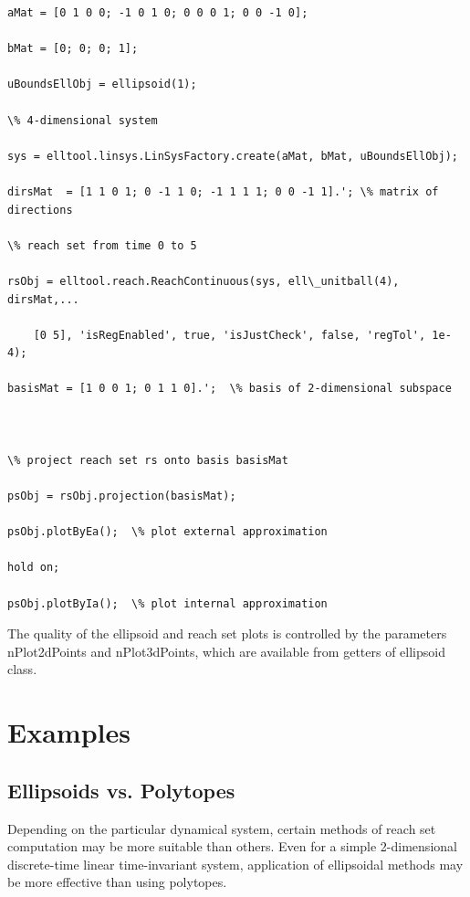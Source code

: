 \documentclass[letterpaper,10pt,english]{sphinxmanual}
\begin{document}
\begin{Verbatim}[commandchars=\\\{\}]
aMat = [0 1 0 0; -1 0 1 0; 0 0 0 1; 0 0 -1 0];

bMat = [0; 0; 0; 1];

uBoundsEllObj = ellipsoid(1);

\% 4-dimensional system

sys = elltool.linsys.LinSysFactory.create(aMat, bMat, uBoundsEllObj);

dirsMat  = [1 1 0 1; 0 -1 1 0; -1 1 1 1; 0 0 -1 1].'; \% matrix of directions

\% reach set from time 0 to 5

rsObj = elltool.reach.ReachContinuous(sys, ell\_unitball(4), dirsMat,...

    [0 5], 'isRegEnabled', true, 'isJustCheck', false, 'regTol', 1e-4);

basisMat = [1 0 0 1; 0 1 1 0].';  \% basis of 2-dimensional subspace



\% project reach set rs onto basis basisMat

psObj = rsObj.projection(basisMat);

psObj.plotByEa();  \% plot external approximation

hold on;

psObj.plotByIa();  \% plot internal approximation
\end{Verbatim}

The quality of the ellipsoid and reach set plots is controlled by the
parameters nPlot2dPoints and nPlot3dPoints, which are available from
getters of ellipsoid class.


\chapter{Examples}
\label{main_source:examples}

\section{Ellipsoids vs. Polytopes}
\label{main_source:ellipsoids-vs-polytopes}
Depending on the particular dynamical system, certain methods of reach
set computation may be more suitable than others. Even for a simple
2-dimensional discrete-time linear time-invariant system, application of
ellipsoidal methods may be more effective than using polytopes.
\end{document}
